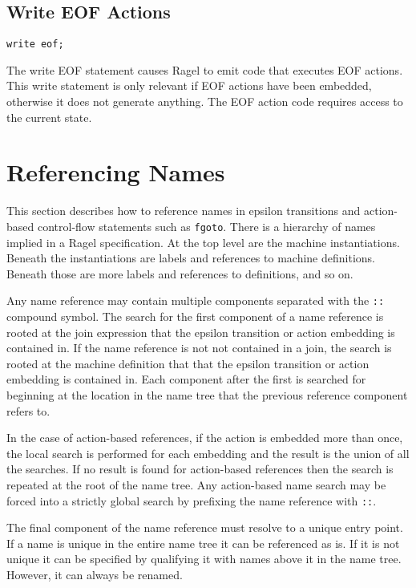 \documentclass[letterpaper,11pt,oneside]{book}
\newcommand{\verbspace}{\vspace{10pt}}
\begin{document}
\subsection{Write EOF Actions}
\begin{verbatim}
write eof;
\end{verbatim}
\verbspace

The write EOF statement causes Ragel to emit code that executes EOF actions.
This write statement is only relevant if EOF actions have been embedded,
otherwise it does not generate anything. The EOF action code requires access to
the current state.

\section{Referencing Names}
\label{labels}

This section describes how to reference names in epsilon transitions and
action-based control-flow statements such as \verb|fgoto|. There is a hierarchy
of names implied in a Ragel specification.  At the top level are the machine
instantiations. Beneath the instantiations are labels and references to machine
definitions. Beneath those are more labels and references to definitions, and
so on.

Any name reference may contain multiple components separated with the \verb|::|
compound symbol.  The search for the first component of a name reference is
rooted at the join expression that the epsilon transition or action embedding
is contained in. If the name reference is not not contained in a join,
the search is rooted at the machine definition that that the epsilon transition or
action embedding is contained in. Each component after the first is searched
for beginning at the location in the name tree that the previous reference
component refers to.

In the case of action-based references, if the action is embedded more than
once, the local search is performed for each embedding and the result is the
union of all the searches. If no result is found for action-based references then
the search is repeated at the root of the name tree.  Any action-based name
search may be forced into a strictly global search by prefixing the name
reference with \verb|::|.

The final component of the name reference must resolve to a unique entry point.
If a name is unique in the entire name tree it can be referenced as is. If it
is not unique it can be specified by qualifying it with names above it in the
name tree. However, it can always be renamed.
\end{document}
